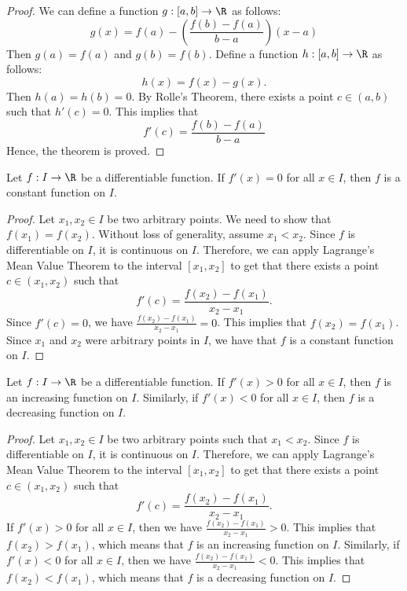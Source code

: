 \documentclass[openany]{book}
\begin{document}
\begin{proof}
    We can define a function $g: [a, b] \to \R$ as follows:
    \[
        g(x) = f(a) - \left( \frac{f(b) - f(a)}{b - a} \right)(x - a)
    \]
    Then $g(a) = f(a)$ and $g(b) = f(b)$. Define a function $h: [a, b] \to \R$ as follows:
\[
    h(x) = f(x) - g(x).
\]
    Then $h(a) = h(b) = 0$. By Rolle's Theorem, there exists a point $c \in (a, b)$ such that $h'(c) = 0$. This implies that
    \[
        f'(c) = \frac{f(b) - f(a)}{b - a} 
    \]
    Hence, the theorem is proved.
\end{proof}
\begin{corollary}
    Let $f: I \to \R$ be a differentiable function. If $f'(x) = 0$ for all $x \in I$, then $f$ is a constant function on $I$.
\end{corollary}
\begin{proof}
    Let $x_1, x_2 \in I$ be two arbitrary points. We need to show that $f(x_1) = f(x_2)$. Without loss of generality, assume $x_1 < x_2$. Since $f$ is differentiable on $I$, it is continuous on $I$. Therefore, we can apply Lagrange's Mean Value Theorem to the interval $[x_1, x_2]$ to get that there exists a point $c \in (x_1, x_2)$ such that
    \[
        f'(c) = \frac{f(x_2) - f(x_1)}{x_2 - x_1}.
    \]
    Since $f'(c) = 0$, we have $\frac{f(x_2) - f(x_1)}{x_2 - x_1} = 0$. This implies that $f(x_2) = f(x_1)$. Since $x_1$ and $x_2$ were arbitrary points in $I$, we have that $f$ is a constant function on $I$.
\end{proof}
\begin{corollary}
    Let $f: I \to \R$ be a differentiable function. If $f'(x) > 0$ for all $x \in I$, then $f$ is an increasing function on $I$. Similarly, if $f'(x) < 0$ for all $x \in I$, then $f$ is a decreasing function on $I$.
\end{corollary}
\begin{proof}
    Let $x_1, x_2 \in I$ be two arbitrary points such that $x_1 < x_2$. Since $f$ is differentiable on $I$, it is continuous on $I$. Therefore, we can apply Lagrange's Mean Value Theorem to the interval $[x_1, x_2]$ to get that there exists a point $c \in (x_1, x_2)$ such that
    \[
        f'(c) = \frac{f(x_2) - f(x_1)}{x_2 - x_1}.
    \]
    If $f'(x) > 0$ for all $x \in I$, then we have $\frac{f(x_2) - f(x_1)}{x_2 - x_1} > 0$. This implies that $f(x_2) > f(x_1)$, which means that $f$ is an increasing function on $I$. Similarly, if $f'(x) < 0$ for all $x \in I$, then we have $\frac{f(x_2) - f(x_1)}{x_2 - x_1} < 0$. This implies that $f(x_2) < f(x_1)$, which means that $f$ is a decreasing function on $I$.
\end{proof}
\end{document}
